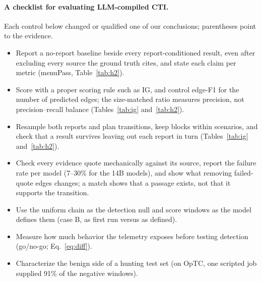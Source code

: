 \documentclass[letterpaper]{article} %
\begin{document}
\paragraph{A checklist for evaluating LLM-compiled CTI.} Each control below changed or qualified one of our conclusions; parentheses point to the evidence.
\begin{itemize}
\item Report a no-report baseline beside every report-conditioned result, even after excluding every source the ground truth cites, and state each claim per metric (menuPass, Table~\ref{tab:h2}).
\item Score with a proper scoring rule such as IG, and control edge-F1 for the number of predicted edges; the size-matched ratio measures precision, not precision--recall balance (Tables~\ref{tab:ig} and~\ref{tab:h2}).
\item Resample both reports and plan transitions, keep blocks within scenarios, and check that a result survives leaving out each report in turn (Tables~\ref{tab:ig} and~\ref{tab:h2}).
\item Check every evidence quote mechanically against its source, report the failure rate per model (7--30\% for the 14B models), and show what removing failed-quote edges changes; a match shows that a passage exists, not that it supports the transition.
\item Use the uniform chain as the detection null and score windows as the model defines them (case B, as first run versus as defined).
\item Measure how much behavior the telemetry exposes before testing detection (go/no-go; Eq.~\eqref{eq:diff}).
\item Characterize the benign side of a hunting test set (on OpTC, one scripted job supplied 91\% of the negative windows).
\end{itemize}
\end{document}
